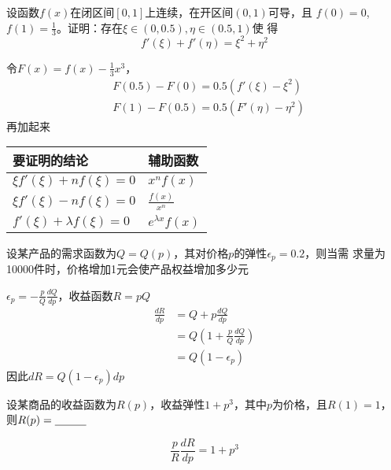 \documentclass{article}
\begin{document}
\begin{examplle}[]
设函数\(f(x)\)在闭区间\([0,1]\)上连续，在开区间\((0,1)\)可导，且
\(f(0)=0\),\(f(1)=\frac{1}{3}\)。证明：存在\(\xi\in(0,0.5),\eta\in(0.5,1)\)使
得
\begin{equation*}
f'(\xi)+f'(\eta)=\xi^2+\eta^2
\end{equation*}

令\(F(x)=f(x)-\frac{1}{3}x^3\)，
\begin{align*}
&F(0.5)-F(0)=0.5(f'(\xi)-\xi^2)\\
&F(1)-F(0.5)=0.5(F'(\eta)-\eta^2)
\end{align*}
再加起来
\end{examplle}

\begin{remark}
\begin{center}
\begin{tabular}{ll}
要证明的结论 & 辅助函数\\
\hline
\(\xi f'(\xi)+nf(\xi)=0\) & \(x^nf(x)\)\\
\(\xi f'(\xi)-nf(\xi)=0\) & \(\frac{f(x)}{x^n}\)\\
\(f'(\xi)+\lambda f(\xi)=0\) & \(e^{\lambda x}f(x)\)\\
\end{tabular}
\end{center}
\end{remark}

\begin{examplle}[]
设某产品的需求函数为\(Q=Q(p)\)，其对价格\(p\)的弹性\(\epsilon_p=0.2\)，则当需
求量为10000件时，价格增加1元会使产品权益增加多少元

\(\epsilon_p=-\frac{p}{Q}\frac{dQ}{dp}\)，收益函数\(R=pQ\)
\begin{align*}
\frac{dR}{dp}&=Q+p\frac{dQ}{dp}\\
&=Q(1+\frac{p}{Q}\frac{dQ}{dp})\\
&=Q(1-\epsilon_p)
\end{align*}
因此\(dR=Q(1-\epsilon_p)dp\)
\end{examplle}

\begin{examplle}[]
设某商品的收益函数为\(R(p)\)，收益弹性\(1+p^3\)，其中\(p\)为价格，且\(R(1)=1\)，
则\(R(p)=\underline{\hspace{1cm}}\)

\begin{equation*}
\frac{p}{R}\frac{dR}{dp}=1+p^3
\end{equation*}
\end{examplle}
\end{document}
